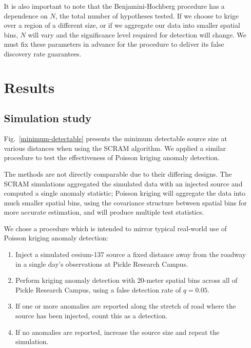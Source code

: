 It is also important to note that the Benjamini-Hochberg procedure has a
dependence on \(N\), the total number of hypotheses tested. If we choose to
krige over a region of a different size, or if we aggregate our data into
smaller spatial bins, \(N\) will vary and the significance level required for
detection will change. We must fix these parameters in advance for the procedure
to deliver its false discovery rate guarantees.

\section{Results}

\subsection{Simulation study}

Fig.~\ref{minimum-detectable} presents the minimum detectable source size at
various distances when using the SCRAM algorithm. We applied a similar procedure
to test the effectiveness of Poisson kriging anomaly detection.

The methods are not directly comparable due to their differing designs. The
SCRAM simulations aggregated the simulated data with an injected source and
computed a single anomaly statistic; Poisson kriging will aggregate the data
into much smaller spatial bins, using the covariance structure between spatial
bins for more accurate estimation, and will produce multiple test statistics.

We chose a procedure which is intended to mirror typical real-world use of
Poisson kriging anomaly detection:

\begin{enumerate}
  \item Inject a simulated cesium-137 source a fixed distance away from the
    roadway in a single day's observations at Pickle Research Campus.
  \item Perform kriging anomaly detection with 20-meter spatial bins across all
    of Pickle Research Campus, using a false detection rate of \(q = 0.05\).
  \item If one or more anomalies are reported along the stretch of road where
    the source has been injected, count this as a detection.
  \item If no anomalies are reported, increase the source size and repeat the
    simulation.
\end{enumerate}


